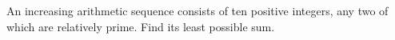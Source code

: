 An increasing arithmetic sequence consists of ten positive integers, any two of which are relatively prime. Find its least possible sum.
